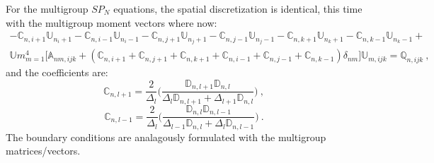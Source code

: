 For the multigroup $SP_N$ equations, the spatial discretization is
identical, this time with the multigroup moment vectors where now:
\begin{multline}
  - \mathbb{C}_{n,i+1} \mathbb{U}_{n_i+1} - \mathbb{C}_{n,i-1}
  \mathbb{U}_{n_i-1} - \mathbb{C}_{n,j+1} \mathbb{U}_{n_j+1} -
  \mathbb{C}_{n,j-1} \mathbb{U}_{n_j-1} - \mathbb{C}_{n,k+1}
  \mathbb{U}_{n_k+1} - \mathbb{C}_{n,k-1} \mathbb{U}_{n_k-1}
  +\\ \mathbb{U}m_{m=1}^4 \Big[\mathbb{A}_{nm,ijk} +
    (\mathbb{C}_{n,i+1}+\mathbb{C}_{n,j+1}+\mathbb{C}_{n,k+1}+
    \mathbb{C}_{n,i-1}+\mathbb{C}_{n,j-1}+\mathbb{C}_{n,k-1})\delta_{nm}\Big]
  \mathbb{U}_{m,ijk} = \mathbb{Q}_{n,ijk}\:,
  \label{eq:discrete_mg_space_spn}
\end{multline}
and the coefficients are:
\begin{equation}
  \mathbb{C}_{n,l+1} = \frac{2}{\Delta_l}\Bigg( \frac{\mathbb{D}_{n,l+1}
    \mathbb{D}_{n,l}}{\Delta_l \mathbb{D}_{n,l+1} + \Delta_{l+1} \mathbb{D}_{n,l}}\Bigg)\:,
  \label{eq:mg_coeff_plus}
\end{equation}
\begin{equation}
  \mathbb{C}_{n,l-1} = \frac{2}{\Delta_l}\Bigg( \frac{\mathbb{D}_{n,l}
    \mathbb{D}_{n,l-1}}{\Delta_{l-1} \mathbb{D}_{n,l} + \Delta_{l}
    \mathbb{D}_{n,l-1}}\Bigg)\:.
  \label{eq:mg_coeff_minus}
\end{equation}
The boundary conditions are analagously formulated with the multigroup
matrices/vectors.
